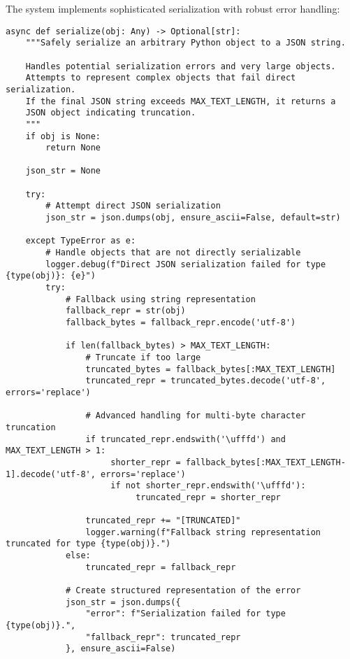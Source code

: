 \documentclass[12pt,a4paper]{article}
\begin{document}
The system implements sophisticated serialization with robust error handling:
\begin{pageablecode}
\begin{verbatim}
async def serialize(obj: Any) -> Optional[str]:
    """Safely serialize an arbitrary Python object to a JSON string.

    Handles potential serialization errors and very large objects.
    Attempts to represent complex objects that fail direct serialization.
    If the final JSON string exceeds MAX_TEXT_LENGTH, it returns a
    JSON object indicating truncation.
    """
    if obj is None:
        return None

    json_str = None

    try:
        # Attempt direct JSON serialization
        json_str = json.dumps(obj, ensure_ascii=False, default=str)

    except TypeError as e:
        # Handle objects that are not directly serializable
        logger.debug(f"Direct JSON serialization failed for type {type(obj)}: {e}")
        try:
            # Fallback using string representation
            fallback_repr = str(obj)
            fallback_bytes = fallback_repr.encode('utf-8')

            if len(fallback_bytes) > MAX_TEXT_LENGTH:
                # Truncate if too large
                truncated_bytes = fallback_bytes[:MAX_TEXT_LENGTH]
                truncated_repr = truncated_bytes.decode('utf-8', errors='replace')

                # Advanced handling for multi-byte character truncation
                if truncated_repr.endswith('\ufffd') and MAX_TEXT_LENGTH > 1:
                     shorter_repr = fallback_bytes[:MAX_TEXT_LENGTH-1].decode('utf-8', errors='replace')
                     if not shorter_repr.endswith('\ufffd'):
                          truncated_repr = shorter_repr

                truncated_repr += "[TRUNCATED]"
                logger.warning(f"Fallback string representation truncated for type {type(obj)}.")
            else:
                truncated_repr = fallback_repr

            # Create structured representation of the error
            json_str = json.dumps({
                "error": f"Serialization failed for type {type(obj)}.",
                "fallback_repr": truncated_repr
            }, ensure_ascii=False)


\end{verbatim}
\end{pageablecode}
\end{document}
